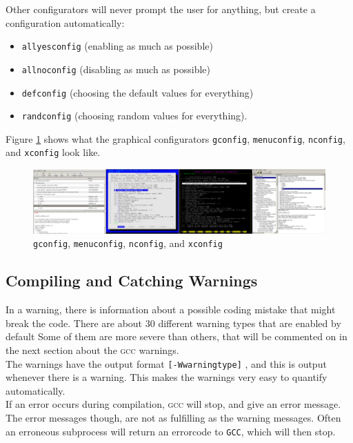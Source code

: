 \documentclass[a4paper,11pt]{report}
\newcommand{\textcode}[1]{
    \fboxsep=1pt
    \texttt{\colorbox{gray!20}{#1}}
}
\newcommand{\figa}{
    \begin{figure}[!htpb]
    \centering
}
\newcommand{\figb}[2]{
    \caption{#1}
    \label{#2}
    \end{figure}
}
\begin{document}
Other configurators will 
never prompt the user for anything, but create a configuration automatically: 
\begin{itemize}
    \item \texttt{allyesconfig} (enabling as much as possible) 
    \item \texttt{allnoconfig} (disabling as much as possible)
    \item \texttt{defconfig} (choosing the default values for everything)
    \item \texttt{randconfig} (choosing random values for everything).
\end{itemize}

Figure \ref{fig:lineofconfigs} shows what the graphical 
configurators \texttt{gconfig}, \texttt{menuconfig}, \texttt{nconfig}, and 
\texttt{xconfig} look like.
\\


\figa
    \includegraphics[scale=0.25]{pngs/configs50percent.png}
\figb{\texttt{gconfig}, \texttt{menuconfig}, \texttt{nconfig}, and 
    \texttt{xconfig}}{fig:lineofconfigs}

        \subsection{Compiling and Catching Warnings}
In a warning, there is information about a possible coding mistake that might 
break the code. There are about 30 different warning types that are enabled by 
default \cite{gccwarnings} Some of them are more severe than others, that will 
be commented on in the next section about the \textsc{gcc} warnings.
\\

The warnings have the output format \textcode{[-Wwarningtype]}, and this is 
output whenever there is a warning. This makes the warnings very easy to 
quantify automatically.
\\

If an error occurs during compilation, \textsc{gcc} will stop, and give an error
message. The error messages though, are not as fulfilling as the warning 
messages. Often an erroneous subprocess will return an errorcode to 
\texttt{GCC}, which will then stop. 
\end{document}
